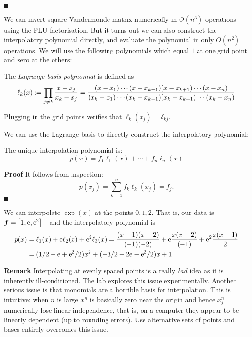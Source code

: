 \ensuremath{\QED}

We can invert square Vandermonde matrix numerically in $O(n^3)$ operations using the PLU factorisation. But it turns out we can also construct the interpolatory polynomial directly, and evaluate the polynomial in only $O(n^2)$ operations. We will use the following polynomials which equal $1$ at one grid point and zero at the others:

\begin{definition} The \emph{Lagrange basis polynomial} is defined as
\[
\ensuremath{\ell}_k(x) := \ensuremath{\prod}_{j \ensuremath{\neq} k} {x-x_j \over x_k - x_j} =  {(x-x_1) \ensuremath{\cdots}(x-x_{k-1})(x-x_{k+1}) \ensuremath{\cdots} (x-x_n) \over (x_k - x_1) \ensuremath{\cdots} (x_k - x_{k-1}) (x_k - x_{k+1}) \ensuremath{\cdots} (x_k - x_n)}
\]
\end{definition}

Plugging in the grid points verifies that $\ensuremath{\ell}_k(x_j) = \ensuremath{\delta}_{kj}$.

We can use the Lagrange basis to directly construct the interpolatory polynomial:

\begin{theorem} The unique interpolation polynomial is:
\[
p(x) = f_1 \ensuremath{\ell}_1(x) + \ensuremath{\cdots} + f_n \ensuremath{\ell}_n(x)
\]
\end{theorem}
\textbf{Proof} It follows from inspection:
\[
p(x_j) = \ensuremath{\sum}_{k=1}^n f_k \ensuremath{\ell}_k(x_j) = f_j.
\]
\ensuremath{\QED}

\begin{example} We can interpolate $\exp(x)$ at the points $0,1,2$. That is, our data is $\ensuremath{\bm{\f}} = \vectt[1, {\rm e},{\rm e}^2]$ and the interpolatory polynomial is
\begin{align*}
p(x) &= \ensuremath{\ell}_1(x) + {\rm e} \ensuremath{\ell}_2(x) + {\rm e}^2 \ensuremath{\ell}_3(x) =
{(x - 1) (x-2) \over (-1)(-2)} + {\rm e} {x (x-2) \over (-1)} +
{\rm e}^2 {x (x-1) \over 2} \\
&= (1/2 - {\rm e} +{\rm e}^2/2)x^2 + (-3/2 + 2 {\rm e}  - {\rm e}^2 /2) x + 1
\end{align*}
\end{example}

\textbf{Remark} Interpolating at evenly spaced points is a really \emph{bad} idea as it  is inherently ill-conditioned. The lab  explores this issue experimentally. Another serious issue is that monomials are a horrible basis for interpolation.  This is intuitive: when $n$ is large $x^n$ is basically zero near the origin and hence $x_j^n$ numerically lose linear independence, that is, on a computer they appear to be linearly dependent (up to rounding errors).  Use alternative sets of points and bases entirely overcomes this issue.

